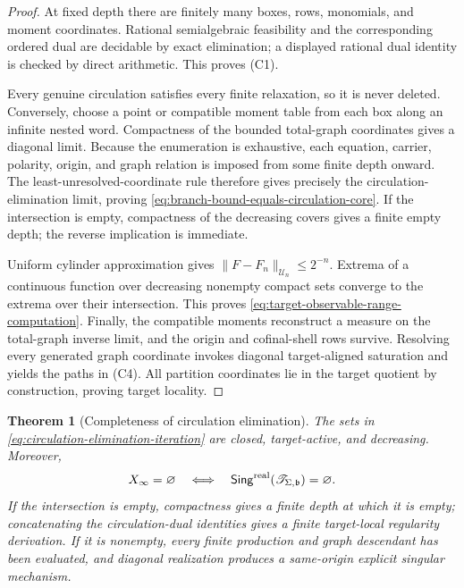 \documentclass[11pt]{article}
\numberwithin{section}{part}
\theoremstyle{plain}
\newtheorem{theorem}{Theorem}[section]
\theoremstyle{definition}
\theoremstyle{remark}
\newcommand{\Spine}{\mathscr T}
\begin{document}
\begin{proof}
At fixed depth there are finitely many boxes, rows, monomials, and moment
coordinates.  Rational semialgebraic feasibility and the corresponding
ordered dual are decidable by exact elimination; a displayed rational dual
identity is checked by direct arithmetic.  This proves \textup{(C1)}.

Every genuine circulation satisfies every finite relaxation, so it is never
deleted.  Conversely, choose a point or compatible moment table from each
box along an infinite nested word.  Compactness of the bounded total-graph
coordinates gives a diagonal limit.  Because the enumeration is exhaustive,
each equation, carrier, polarity, origin, and graph relation is imposed from
some finite depth onward.  The least-unresolved-coordinate rule therefore
gives precisely the circulation-elimination limit, proving
\eqref{eq:branch-bound-equals-circulation-core}.  If the intersection is
empty, compactness of the decreasing covers gives a finite empty depth; the
reverse implication is immediate.

Uniform cylinder approximation gives
\(\lVert F-F_n\rVert_{\mathscr U_n}\le2^{-n}\).  Extrema of a continuous
function over decreasing nonempty compact sets converge to the extrema over
their intersection.  This proves
\eqref{eq:target-observable-range-computation}.  Finally, the compatible
moments reconstruct a measure on the total-graph inverse limit, and the
origin and cofinal-shell rows survive.  Resolving every generated graph
coordinate invokes diagonal target-aligned saturation and yields the paths
in \textup{(C4)}.  All partition coordinates lie in the target quotient by
construction, proving target locality.
\end{proof}

\begin{theorem}[Completeness of circulation elimination]
\label{thm:circulation-elimination-completeness}
The sets in \eqref{eq:circulation-elimination-iteration} are closed,
target-active, and decreasing.  Moreover,
\begin{equation}
 \label{eq:circulation-core-equals-singular-core}
 X_\infty=\varnothing
 \quad\Longleftrightarrow\quad
 \mathsf{Sing}^{\rm real}
       (\Spine_{\Sigma,\mathfrak b})=\varnothing.
\end{equation}
If the intersection is empty, compactness gives a finite depth at which it is
empty; concatenating the circulation-dual identities gives a finite
target-local regularity derivation.  If it is nonempty, every finite
production and graph descendant has been evaluated, and diagonal realization
produces a same-origin explicit singular mechanism.
\end{theorem}
\end{document}
